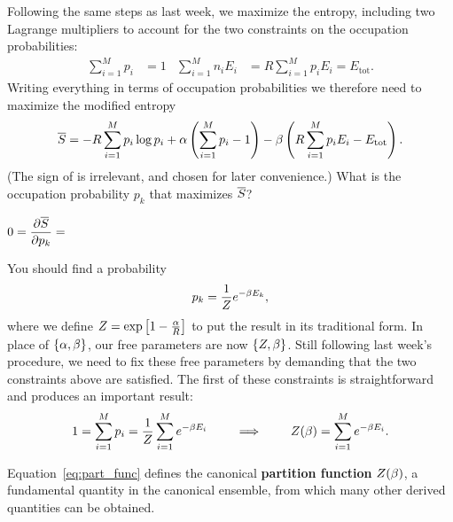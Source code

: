 Following the same steps as last week, we maximize the entropy, including two Lagrange multipliers to account for the two constraints on the occupation probabilities:
\begin{align*}
  \sum_{i = 1}^M p_i & = 1 &
  \sum_{i = 1}^M n_i E_i & = R \sum_{i = 1}^M p_i E_i = E_{\text{tot}}.
\end{align*}
Writing everything in terms of occupation probabilities we therefore need to maximize the modified entropy
\begin{equation*}
  \overline S = -R \sum_{i = 1}^M p_i \log p_i + \alpha\left(\sum_{i = 1}^M p_i - 1\right) - \beta\left(R \sum_{i = 1}^M p_i E_i - E_{\text{tot}}\right).
\end{equation*}
(The sign of \be is irrelevant, and chosen for later convenience.)
What is the occupation probability $p_k$ that maximizes $\overline S$?
\begin{mdframed}
  $\displaystyle 0 = \frac{\partial \overline S}{\partial p_k} = $ \\[120 pt] %
\end{mdframed}

You should find a probability
\begin{equation}
  \label{eq:occ_prob}
  p_k = \frac{1}{Z} e^{-\beta E_k},
\end{equation}
where we define $Z = \exp\left[1 - \frac{\alpha}{R}\right]$ to put the result in its traditional form.
In place of $\left\{\alpha, \beta\right\}$, our free parameters are now $\left\{Z, \beta\right\}$.
Still following last week's procedure, we need to fix these free parameters by demanding that the two constraints above are satisfied.
The first of these constraints is straightforward and produces an important result:
\begin{equation}
  \label{eq:part_func}
  1 = \sum_{i = 1}^M p_i = \frac{1}{Z} \sum_{i = 1}^M e^{-\beta E_i} \qquad \implies \qquad Z(\beta) = \sum_{i = 1}^M e^{-\beta E_i}.
\end{equation}

\begin{shaded}
  Equation~\ref{eq:part_func} defines the canonical \textbf{partition function} $Z(\beta)$, a fundamental quantity in the canonical ensemble, from which many other derived quantities can be obtained.
\end{shaded}

